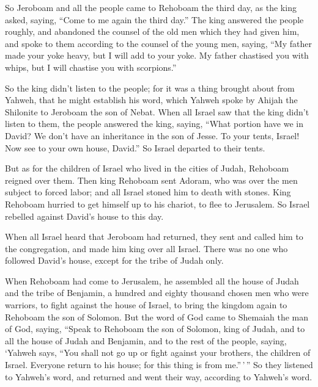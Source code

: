  So Jeroboam and all the people came to Rehoboam the third
day, as the king asked, saying, ``Come to me again the third day.''
 The king answered the people roughly, and abandoned the
counsel of the old men which they had given him,  and spoke
to them according to the counsel of the young men, saying, ``My father
made your yoke heavy, but I will add to your yoke. My father chastised
you with whips, but I will chastise you with scorpions.''

 So the king didn't listen to the people; for it was a
thing brought about from Yahweh, that he might establish his word, which
Yahweh spoke by Ahijah the Shilonite to Jeroboam the son of Nebat.
 When all Israel saw that the king didn't listen to them,
the people answered the king, saying, ``What portion have we in David?
We don't have an inheritance in the son of Jesse. To your tents, Israel!
Now see to your own house, David.'' So Israel departed to their tents.

 But as for the children of Israel who lived in the cities
of Judah, Rehoboam reigned over them.  Then king Rehoboam
sent Adoram, who was over the men subject to forced labor; and all
Israel stoned him to death with stones. King Rehoboam hurried to get
himself up to his chariot, to flee to Jerusalem.  So Israel
rebelled against David's house to this day.

 When all Israel heard that Jeroboam had returned, they
sent and called him to the congregation, and made him king over all
Israel. There was no one who followed David's house, except for the
tribe of Judah only.

 When Rehoboam had come to Jerusalem, he assembled all the
house of Judah and the tribe of Benjamin, a hundred and eighty thousand
chosen men who were warriors, to fight against the house of Israel, to
bring the kingdom again to Rehoboam the son of Solomon. 
But the word of God came to Shemaiah the man of God, saying,
 ``Speak to Rehoboam the son of Solomon, king of Judah, and
to all the house of Judah and Benjamin, and to the rest of the people,
saying,  `Yahweh says, ``You shall not go up or fight
against your brothers, the children of Israel. Everyone return to his
house; for this thing is from me.''\,'\,'' So they listened to Yahweh's
word, and returned and went their way, according to Yahweh's word.

